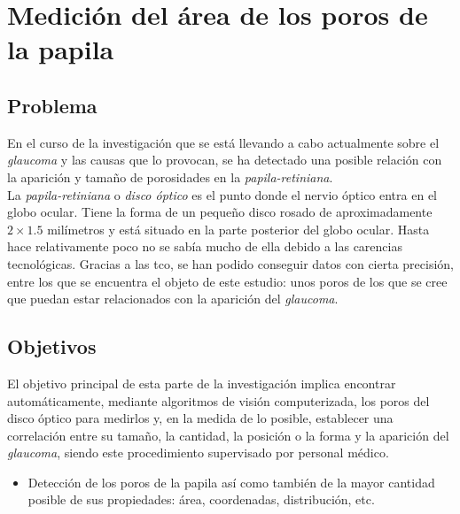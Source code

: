 \chapter{Medición del área de los poros de la papila}
\section{Problema}
En el curso de la investigación que se está llevando a cabo
actualmente sobre el \emph{\gls{glaucoma}} y las causas que lo provocan, se
ha detectado una posible relación con la aparición y tamaño de
porosidades en la \emph{\gls{papila-retiniana}}. \\
La \emph{\gls{papila-retiniana}} o \emph{disco óptico} es el punto donde el
nervio óptico entra en el globo ocular. Tiene la forma de un pequeño
disco rosado de aproximadamente $2 \times 1.5$ milímetros y está
situado en la parte posterior del globo ocular. Hasta hace
relativamente poco no se sabía mucho de ella debido a las carencias
tecnológicas. Gracias a las \gls{tco}, se han podido conseguir datos
con cierta precisión, entre los que se encuentra el objeto de este
estudio: unos poros de los que se cree que puedan estar
relacionados con la aparición del \emph{\gls{glaucoma}}.\\

\section{Objetivos}
El objetivo principal de esta parte de la investigación implica
encontrar automáticamente, mediante algoritmos de visión
computerizada, los poros del disco óptico para medirlos y, en la
medida de lo posible, establecer una correlación entre su tamaño, la
cantidad, la posición o la forma y la aparición del \emph{\gls{glaucoma}},
siendo este procedimiento supervisado por personal médico.
\begin{itemize}
\item Detección de los poros de la papila así como también de la mayor
  cantidad posible de sus propiedades: área, coordenadas,
  distribución, etc.
\end{itemize}

